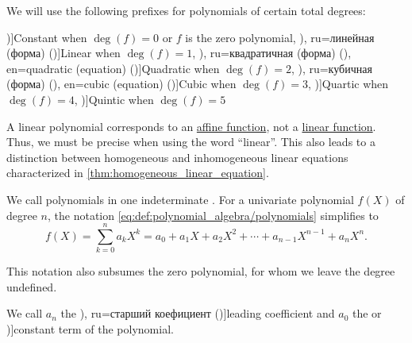 \begin{definition}\label{def:polynomial_degree_terminology}
  We will use the following prefixes for polynomials of certain total degrees:
  \begin{thmenum}
     \term[ru=константа (\cite[118]{Тыртышников2007ЛинейнаяАлгебра})]{Constant} when \( \deg(f) = 0 \) or \( f \) is the zero polynomial,
     \term[bg=линейна (функция) (\cite[1]{Обрешков1962ВисшаАлгебра}), ru=линейная (форма) (\cite[315]{Курош1968КурсВысшейАлгебры})]{Linear} when \( \deg(f) = 1 \),
     \term[bg=квадратна (функция) (\cite[1]{Обрешков1962ВисшаАлгебра}), ru=квадратичная (форма) (\cite[315]{Курош1968КурсВысшейАлгебры}), en=quadratic (equation) (\cite[360]{RosenEtAl2018DiscreteMathematicsHandbook})]{Quadratic} when \( \deg(f) = 2 \),
     \term[bg=кубична (форма) (\cite[1]{Обрешков1962ВисшаАлгебра}), ru=кубичная (форма) (\cite[315]{Курош1968КурсВысшейАлгебры}), en=cubic (equation) (\cite[360]{RosenEtAl2018DiscreteMathematicsHandbook})]{Cubic} when \( \deg(f) = 3 \),
     \term[en=quartic (equation) (\cite[360]{RosenEtAl2018DiscreteMathematicsHandbook})]{Quartic} when \( \deg(f) = 4 \),
     \term[en=quintic (equation) (\cite[360]{RosenEtAl2018DiscreteMathematicsHandbook})]{Quintic} when \( \deg(f) = 5 \)
  \end{thmenum}
\end{definition}
\begin{comments}
  \item A linear polynomial corresponds to an \hyperref[def:affine_operator]{affine function}, not a \hyperref[def:linear_function]{linear function}. Thus, we must be precise when using the word \enquote{linear}. This also leads to a distinction between homogeneous and inhomogeneous linear equations characterized in \cref{thm:homogeneous_linear_equation}.
\end{comments}

\begin{definition}\label{def:univariate_polynomial}\mimprovised
  We call polynomials in one indeterminate . For a univariate polynomial \( f(X) \) of degree \( n \), the notation \eqref{eq:def:polynomial_algebra/polynomials} simplifies to
  \begin{equation}\label{eq:def:univariate_polynomial}
    f(X) = \sum_{k=0}^n a_k X^k = a_0 + a_1 X + a_2 X^2 + \cdots + a_{n-1} X^{n-1} + a_n X^n.
  \end{equation}

  This notation also subsumes the zero polynomial, for whom we leave the degree undefined.

  We call \( a_n \) the \term[bg=старши коефициент (\cite[23]{ГеновМиховскиМоллов1991Алгебра}), ru=старший коефициент (\cite[118]{Тыртышников2007ЛинейнаяАлгебра})]{leading coefficient} and \( a_0 \) the  or \term[ru=свободный член (\cite[118]{Тыртышников2007ЛинейнаяАлгебра})]{constant term} of the polynomial.
\end{definition}

